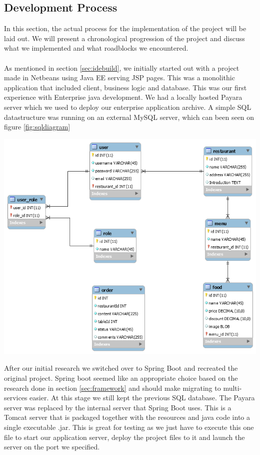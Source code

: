 \documentclass[12pt]{article}
\newenvironment{Figure}
	{\par\medskip\noindent\minipage{\linewidth}}
	{\endminipage\par\medskip}
\begin{document}
\begin{multicols}{2}
\subsection{Development Process}
\noindent In this section, the actual process for the implementation of the project will be laid out. We will present a chronological progression of the project and discuss what we implemented and what roadblocks we encountered.
\\\\
As mentioned in section \ref{sec:idebuild}, we initially started out with a project made in Netbeans using Java EE serving JSP pages. This was a monolithic application that included client, business logic and database. This was our first experience with Enterprise java development. We had a locally hosted Payara server which we used to deploy our enterprise application archive. A simple SQL datastructure was running on an external MySQL server, which can been seen on figure \ref{fig:sqldiagram}
\begin{Figure}
	\centering
	\includegraphics[width=\linewidth]{illustrations/database.png}
	\label{fig:sqldiagram}
\end{Figure}
\noindent After our initial research we switched over to Spring Boot and recreated the original project. Spring boot seemed like an appropriate choice based on the research done in section \ref{sec:framework} and should make migrating to multi-services easier. At this stage we still kept the previous SQL database. The Payara server was replaced by the internal server that Spring Boot uses. This is a Tomcat server that is packaged together with the resources and java code into a single executable .jar. This is great for testing as we just have to execute this one file to start our application server, deploy the project files to it and launch the server on the port we specified.

\end{multicols}
\end{document}
